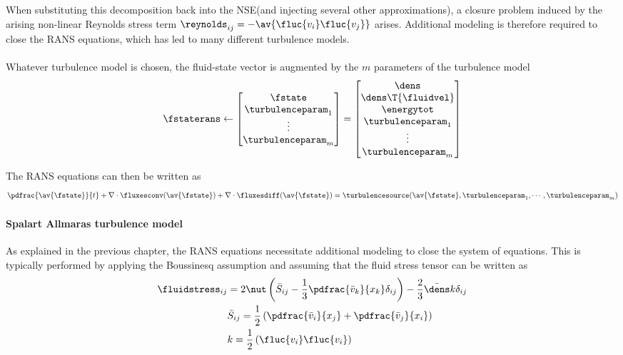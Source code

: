 \documentclass[../main.tex]{subfiles}
\begin{document}
When substituting this decomposition back into the \ac{NSE}(and injecting several other approximations), a closure problem induced by the arising non-linear Reynolds stress term ${\reynolds}_{ij}=-\av{\fluc{v_i}\fluc{v_j}}$ arises. Additional modeling is therefore required to close the \ac{RANS} equations, which has led to many different turbulence models.\\
\\
Whatever turbulence model is chosen, the fluid-state vector is augmented by the $m$ parameters of the turbulence model
\begin{align}
\fstaterans \leftarrow
\begin{bmatrix}
\fstate            \\
\turbulenceparam_1 \\
\vdots             \\
\turbulenceparam_m
\end{bmatrix} =
	\begin{bmatrix}
	\dens              \\
	\dens\T{\fluidvel} \\
	\energytot         \\
	\turbulenceparam_1 \\
	\vdots             \\
	\turbulenceparam_m
	\end{bmatrix}
\end{align}

The \ac{RANS} equations can then be written as
\begin{align}\label{eq:rans_eqautions}
\pdfrac{\av{\fstate}}{t} + \nabla\cdot\fluxesconv(\av{\fstate}) +  \nabla\cdot\fluxesdiff(\av{\fstate}) =
\turbulencesource(\av{\fstate},\turbulenceparam_1,\cdots,\turbulenceparam_m)
\end{align}

\paragraph{Spalart Allmaras turbulence model}

As explained in the previous chapter, the \ac{RANS} equations necessitate additional modeling to close the system of equations. This is typically performed by applying the Boussinesq assumption and assuming that the fluid stress tensor can be written as
\begin{align}
\fluidstress_{ij}&=2 \nut \left( \bar{S}_{ij}-\frac{1}{3} \pdfrac{\bar{v}_k}{x_k} \delta_{ij} \right) - \frac{2}{3}\bar{\dens}k\delta_{ij} \label{eq:rans_turbulent_stress}\\
&\bar{S}_{ij}=\frac{1}{2}\left( \pdfrac{\bar{v}_i}{x_j}+\pdfrac{\bar{v}_j}{x_i} \right) \\
&k=\frac{1}{2} \left( \fluc{v_i}\fluc{v_i} \right)
\end{align}
\end{document}
